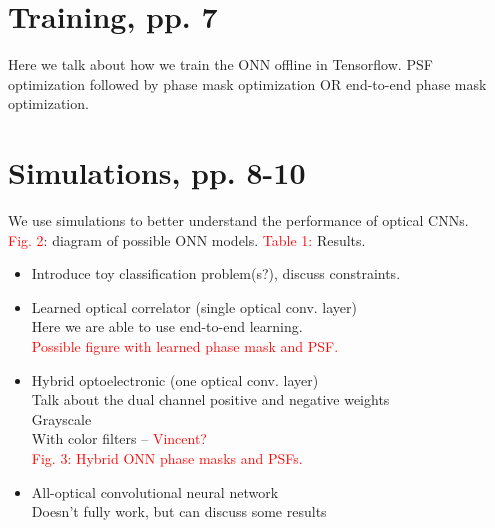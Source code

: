\documentclass[runningheads]{llncs}
\newcommand{\red}[1]{\textcolor{red}{#1}}
\begin{document}

\section{Training, pp. 7}
Here we talk about how we train the ONN offline in Tensorflow. PSF optimization followed by phase mask optimization OR end-to-end phase mask optimization.

\section{Simulations, pp. 8-10}
\label{sec:simulation}
We use simulations to better understand the performance of optical CNNs. \\
\red{Fig. 2}: diagram of possible ONN models.
\red{Table 1:} Results.
\begin{itemize}
\item Introduce toy classification problem(s?), discuss constraints.
\item Learned optical correlator (single optical conv. layer) \\ Here we are able to use end-to-end learning. \\
\red{Possible figure with learned phase mask and PSF.}
\item Hybrid optoelectronic (one optical conv. layer)\\ 
	Talk about the dual channel positive and negative weights\\
	Grayscale \\
	With color filters – \red{Vincent?}\\
\red{Fig. 3: Hybrid ONN phase masks and PSFs.}
\item All-optical convolutional neural network \\
Doesn’t fully work, but can discuss some results
\end{itemize}
\end{document}
